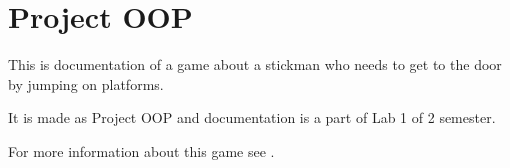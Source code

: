 \chapter{Project OOP}
\hypertarget{index}{}\label{index}
This is documentation of a game about a stickman who needs to get to the door by jumping on platforms.

It is made as Project OOP and documentation is a part of Lab 1 of 2 semester.

For more information about this game see . 